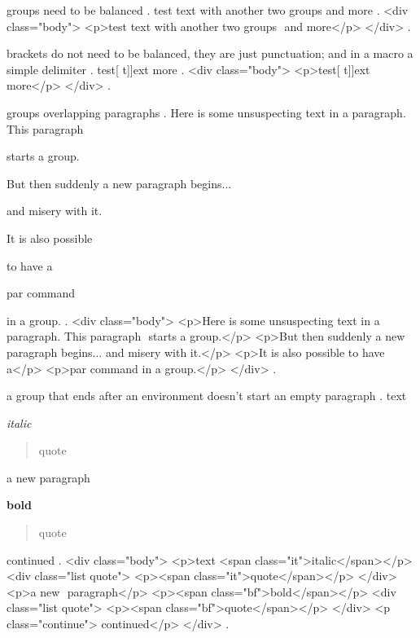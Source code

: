 groups need to be balanced
.
test {text with {{another }two} groups } and more
.
<div class="body">
<p>test text with another two​ groups ​ and more</p>
</div>
.


brackets do not need to be balanced, they are just punctuation; and in a macro a simple delimiter
.
test[ {t]]ext} more
.
<div class="body">
<p>test[ t]]ext​ more</p>
</div>
.


groups overlapping paragraphs
.
Here is some unsuspecting text in a paragraph. This paragraph { starts a group.

But then suddenly a new paragraph begins... } and misery with it.

It is also possible {to have a\par par command} in a group.
.
<div class="body">
<p>Here is some unsuspecting text in a paragraph. This paragraph ​ starts a group.</p>
<p>But then suddenly a new paragraph begins... ​ and misery with it.</p>
<p>It is also possible to have a</p>
<p>par command​ in a group.</p>
</div>
.


a group that ends after an environment doesn't start an empty paragraph
.
text {\itshape italic
\begin{quote}
    quote
\end{quote}}

a new {} paragraph

{}

{\bfseries bold
\begin{quote}
    quote
\end{quote}}
continued
.
<div class="body">
<p>text <span class="it">italic</span></p>
<div class="list quote">
<p><span class="it">quote</span></p>
</div>
<p>a new ​ paragraph</p>
<p><span class="bf">bold</span></p>
<div class="list quote">
<p><span class="bf">quote</span></p>
</div>
<p class="continue">​ continued</p>
</div>
.
